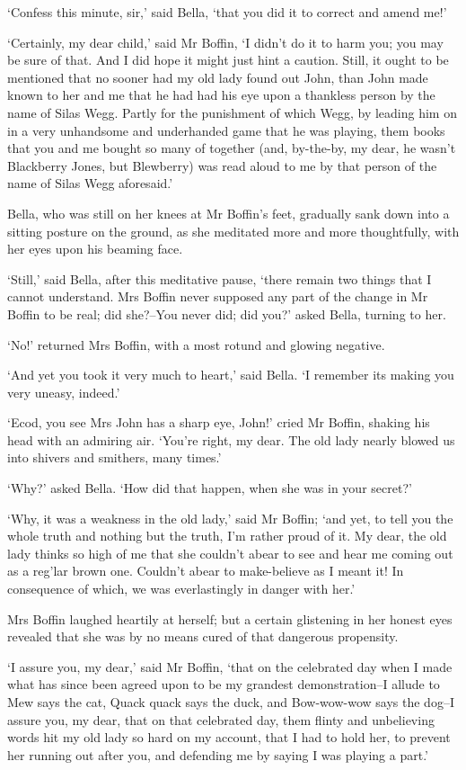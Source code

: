 ‘Confess this minute, sir,’ said Bella, ‘that you did it to correct and
amend me!’

‘Certainly, my dear child,’ said Mr Boffin, ‘I didn’t do it to harm you;
you may be sure of that. And I did hope it might just hint a caution.
Still, it ought to be mentioned that no sooner had my old lady found out
John, than John made known to her and me that he had had his eye upon a
thankless person by the name of Silas Wegg. Partly for the punishment of
which Wegg, by leading him on in a very unhandsome and underhanded
game that he was playing, them books that you and me bought so many
of together (and, by-the-by, my dear, he wasn’t Blackberry Jones, but
Blewberry) was read aloud to me by that person of the name of Silas Wegg
aforesaid.’

Bella, who was still on her knees at Mr Boffin’s feet, gradually sank
down into a sitting posture on the ground, as she meditated more and
more thoughtfully, with her eyes upon his beaming face.

‘Still,’ said Bella, after this meditative pause, ‘there remain two
things that I cannot understand. Mrs Boffin never supposed any part of
the change in Mr Boffin to be real; did she?--You never did; did you?’
asked Bella, turning to her.

‘No!’ returned Mrs Boffin, with a most rotund and glowing negative.

‘And yet you took it very much to heart,’ said Bella. ‘I remember its
making you very uneasy, indeed.’

‘Ecod, you see Mrs John has a sharp eye, John!’ cried Mr Boffin, shaking
his head with an admiring air. ‘You’re right, my dear. The old lady
nearly blowed us into shivers and smithers, many times.’

‘Why?’ asked Bella. ‘How did that happen, when she was in your secret?’

‘Why, it was a weakness in the old lady,’ said Mr Boffin; ‘and yet, to
tell you the whole truth and nothing but the truth, I’m rather proud of
it. My dear, the old lady thinks so high of me that she couldn’t abear
to see and hear me coming out as a reg’lar brown one. Couldn’t abear
to make-believe as I meant it! In consequence of which, we was
everlastingly in danger with her.’

Mrs Boffin laughed heartily at herself; but a certain glistening in her
honest eyes revealed that she was by no means cured of that dangerous
propensity.

‘I assure you, my dear,’ said Mr Boffin, ‘that on the celebrated
day when I made what has since been agreed upon to be my grandest
demonstration--I allude to Mew says the cat, Quack quack says the
duck, and Bow-wow-wow says the dog--I assure you, my dear, that on that
celebrated day, them flinty and unbelieving words hit my old lady so hard
on my account, that I had to hold her, to prevent her running out after
you, and defending me by saying I was playing a part.’

